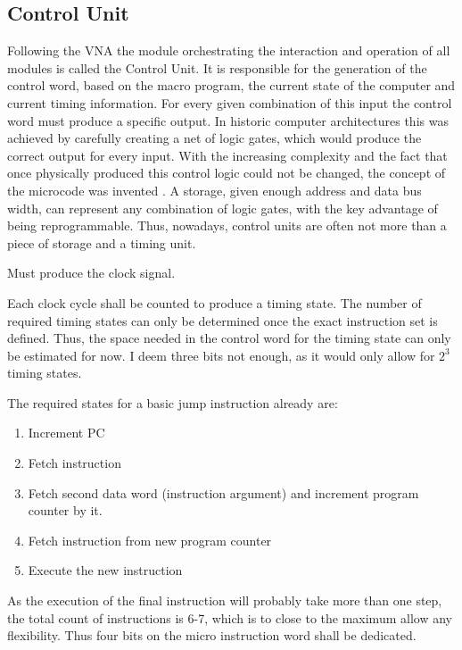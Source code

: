 \subsection{Control Unit}
Following the VNA the module orchestrating the interaction and operation of all modules is called the Control Unit. It is responsible for the generation of the control word, based on the macro program, the current state of the computer and current timing information. For every given combination of this input the control word must produce a specific output. In historic computer architectures this was achieved by carefully creating a net of logic gates, which would produce the correct output for every input. With the increasing complexity and the fact that once physically produced this control logic could not be changed, the concept of the microcode was invented \cite{cite.needed}. A storage, given enough address and data bus width, can represent any combination of logic gates, with the key advantage of being reprogrammable. Thus, nowadays, control units are often not more than a piece of storage and a timing unit. 




\begin{arch-requirement}
  Must produce the clock signal. 
\end{arch-requirement}

Each clock cycle shall be counted to produce a timing state. 
The number of required timing states can only be determined once the exact instruction set is defined. Thus, the space needed in the control word for the timing state can only be estimated for now. I deem three bits not enough, as it would only allow for $2^3$ timing states. 

The required states for a basic jump instruction already are: 
\begin{enumerate}
  \item Increment PC
  \item Fetch instruction
  \item Fetch second data word (instruction argument) and increment program counter by it.
  \item Fetch instruction from new program counter
  \item Execute the new instruction
\end{enumerate}
    
As the execution of the final instruction will probably take more than one step, the total count of instructions is 6-7, which is to close to the maximum allow any flexibility. Thus four bits on the micro instruction word shall be dedicated.


